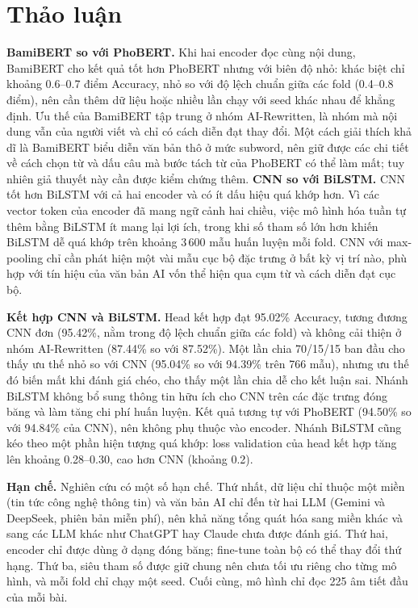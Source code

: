 \documentclass[conference,a4paper]{IEEEtran}
\begin{document}
\section{Thảo luận}
\label{sec:discussion}

\textbf{BamiBERT so với PhoBERT.} Khi hai encoder đọc cùng nội dung, BamiBERT cho kết quả tốt hơn PhoBERT nhưng với biên độ nhỏ: khác biệt chỉ khoảng 0.6--0.7 điểm Accuracy, nhỏ so với độ lệch chuẩn giữa các fold (0.4--0.8 điểm), nên cần thêm dữ liệu hoặc nhiều lần chạy với seed khác nhau để khẳng định. Ưu thế của BamiBERT tập trung ở nhóm AI-Rewritten, là nhóm mà nội dung vẫn của người viết và chỉ có cách diễn đạt thay đổi. Một cách giải thích khả dĩ là BamiBERT biểu diễn văn bản thô ở mức subword, nên giữ được các chi tiết về cách chọn từ và dấu câu mà bước tách từ của PhoBERT có thể làm mất; tuy nhiên giả thuyết này cần được kiểm chứng thêm.
\textbf{CNN so với BiLSTM.} CNN tốt hơn BiLSTM với cả hai encoder và có ít dấu hiệu quá khớp hơn. Vì các vector token của encoder đã mang ngữ cảnh hai chiều, việc mô hình hóa tuần tự thêm bằng BiLSTM ít mang lại lợi ích, trong khi số tham số lớn hơn khiến BiLSTM dễ quá khớp trên khoảng 3\,600 mẫu huấn luyện mỗi fold. CNN với max-pooling chỉ cần phát hiện một vài mẫu cục bộ đặc trưng ở bất kỳ vị trí nào, phù hợp với tín hiệu của văn bản AI vốn thể hiện qua cụm từ và cách diễn đạt cục bộ.

\textbf{Kết hợp CNN và BiLSTM.} Head kết hợp đạt 95.02\% Accuracy, tương đương CNN đơn (95.42\%, nằm trong độ lệch chuẩn giữa các fold) và không cải thiện ở nhóm AI-Rewritten (87.44\% so với 87.52\%). Một lần chia 70/15/15 ban đầu cho thấy ưu thế nhỏ so với CNN (95.04\% so với 94.39\% trên 766 mẫu), nhưng ưu thế đó biến mất khi đánh giá chéo, cho thấy một lần chia dễ cho kết luận sai. Nhánh BiLSTM không bổ sung thông tin hữu ích cho CNN trên các đặc trưng đóng băng và làm tăng chi phí huấn luyện. Kết quả tương tự với PhoBERT (94.50\% so với 94.84\% của CNN), nên không phụ thuộc vào encoder. Nhánh BiLSTM cũng kéo theo một phần hiện tượng quá khớp: loss validation của head kết hợp tăng lên khoảng 0.28--0.30, cao hơn CNN (khoảng 0.2).

\textbf{Hạn chế.} Nghiên cứu có một số hạn chế. Thứ nhất, dữ liệu chỉ thuộc một miền (tin tức công nghệ thông tin) và văn bản AI chỉ đến từ hai LLM (Gemini và DeepSeek, phiên bản miễn phí), nên khả năng tổng quát hóa sang miền khác và sang các LLM khác như ChatGPT hay Claude chưa được đánh giá. Thứ hai, encoder chỉ được dùng ở dạng đóng băng; fine-tune toàn bộ có thể thay đổi thứ hạng. Thứ ba, siêu tham số được giữ chung nên chưa tối ưu riêng cho từng mô hình, và mỗi fold chỉ chạy một seed. Cuối cùng, mô hình chỉ đọc 225 âm tiết đầu của mỗi bài.
\end{document}
